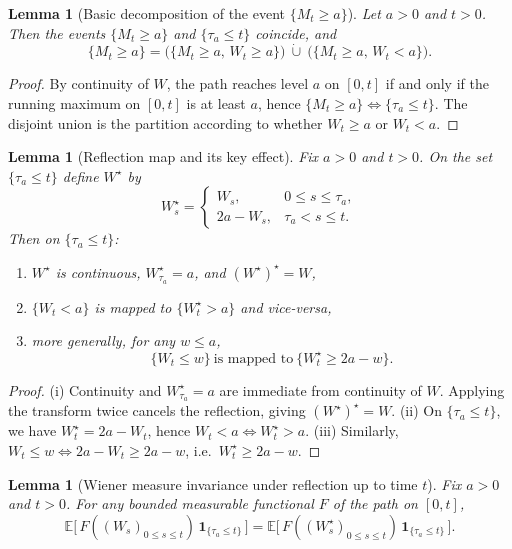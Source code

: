 \documentclass[11pt]{article}
\newtheorem{lemma}[theorem]{Lemma}
\theoremstyle{definition}
\theoremstyle{remark}
\newcommand{\E}{\mathbb{E}}
\begin{document}
\begin{lemma}[Basic decomposition of the event $\{M_t\ge a\}$]\label{lem:decomp}
Let $a>0$ and $t>0$. Then the events $\{M_t\ge a\}$ and $\{\tau_a\le t\}$ coincide, and
\[
\{M_t\ge a\}
=
\big(\{M_t\ge a,\,W_t\ge a\}\big)\ \dot\cup\ \big(\{M_t\ge a,\,W_t<a\}\big).
\]
\end{lemma}

\begin{proof}
By continuity of $W$, the path reaches level $a$ on $[0,t]$ if and only if the running maximum on $[0,t]$ is at least $a$,
hence $\{M_t\ge a\}\iff\{\tau_a\le t\}$.
The disjoint union is the partition according to whether $W_t\ge a$ or $W_t<a$.
\end{proof}

\begin{lemma}[Reflection map and its key effect]\label{lem:reflection-map}
Fix $a>0$ and $t>0$. On the set $\{\tau_a\le t\}$ define $W^\star$ by
\[
W_s^\star=
\begin{cases}
W_s, & 0\le s\le \tau_a,\\
2a-W_s, & \tau_a< s\le t.
\end{cases}
\]
Then on $\{\tau_a\le t\}$:
\begin{enumerate}[label=(\roman*),leftmargin=2em]
\item $W^\star$ is continuous, $W^\star_{\tau_a}=a$, and $(W^\star)^\star=W$,
\item $\{W_t<a\}$ is mapped to $\{W_t^\star>a\}$ and vice-versa,
\item more generally, for any $w\le a$,
\[
\{W_t\le w\}\ \text{is mapped to}\ \{W_t^\star \ge 2a-w\}.
\]
\end{enumerate}
\end{lemma}

\begin{proof}
(i) Continuity and $W^\star_{\tau_a}=a$ are immediate from continuity of $W$.
Applying the transform twice cancels the reflection, giving $(W^\star)^\star=W$.
(ii) On $\{\tau_a\le t\}$, we have $W_t^\star=2a-W_t$, hence $W_t<a \iff W_t^\star>a$.
(iii) Similarly, $W_t\le w \iff 2a-W_t \ge 2a-w$, i.e.\ $W_t^\star\ge 2a-w$.
\end{proof}

\begin{lemma}[Wiener measure invariance under reflection up to time $t$]\label{lem:invariance}
Fix $a>0$ and $t>0$. For any bounded measurable functional $F$ of the path on $[0,t]$,
\[
\E\big[\,F((W_s)_{0\le s\le t})\,\mathbf 1_{\{\tau_a\le t\}}\,\big]
=
\E\big[\,F((W^\star_s)_{0\le s\le t})\,\mathbf 1_{\{\tau_a\le t\}}\,\big].
\]
\end{lemma}
\end{document}

